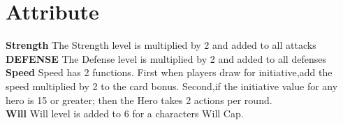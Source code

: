 \section{Attribute}
\textbf{Strength}
The Strength level is multiplied by 2 and added to all attacks\\
\textbf{DEFENSE}
The Defense level is multiplied by 2 and added to all defenses\\
\textbf{Speed}
Speed has 2 functions.  First when players draw for initiative,add the speed multiplied by 2 to the card bonus.  Second,if the initiative value for any hero is 15 or greater; then the Hero takes 2 actions per round.\\
\textbf{Will} Will level is added to 6 for a characters Will Cap.

